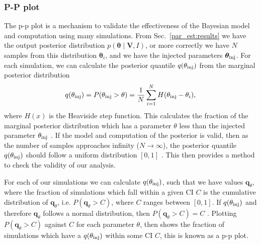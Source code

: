 \subsubsection{\label{par_est:results:simulations:ppplot}P-P plot}

The p-p plot is a mechanism to validate the effectiveness of the Bayesian model and computation using many simulations.
From Sec.~\ref{par_est:results} we have the output posterior distribution $p(\bm{\theta} \mid \bm{V}, I)$, or more correctly we have $N$ samples from this distribution $\bm{\theta}_i$, and we have the injected parameters $\bm{\theta}_{\rm{inj}}$.
For each simulation, we can calculate the posterior quantile $q(\theta_{\rm{inj}})$ from the marginal posterior distribution
\begin{equation}
    q(\theta_{\rm{inj}}) = P(\theta_{\rm{inj}} > \theta) = \frac{1}{N} \sum_{i=1}^{N} H(\theta_{\rm{inj}} - \theta_i),
\end{equation}
where $H(x)$ is the Heaviside step function. 
This calculates the fraction of the marginal posterior distribution which has a parameter $\theta$ less than the injected parameter $\theta_{\rm{inj}}$ \citep{cook2006ValidationSoftware}.
If the model and computation of the posterior is valid, then as the number of samples approaches infinity ($N \rightarrow \infty$), the posterior quantile $q(\theta_{\rm{inj}})$ should follow a uniform distribution $[0,1]$ \citep{cook2006ValidationSoftware}.
This then provides a method to check the validity of our analysis.

For each of our simulations we can calculate $q(\theta_{\rm{inj}})$, such that we have values $\bm{q}_{\theta}$, where the fraction of simulations which fall within a given \gls{CI} $C$ is the cumulative distribution of $\bm{q}_{\theta}$, i.e. $P(\bm{q}_{\theta} > C)$, where $C$ ranges between $[0,1]$.
If $q(\theta_{\rm{inj}})$ and therefore $\bm{q}_{\theta}$ follows a normal distribution, then $P(\bm{q}_{\theta} > C) = C$ \citep{cook2006ValidationSoftware}.
Plotting $P(\bm{q}_{\theta} > C)$ against $C$ for each parameter $\theta$, then shows the fraction of simulations which have a $q(\theta_{\rm{inj}})$ within some \gls{CI} $C$, this is known as a p-p plot.

